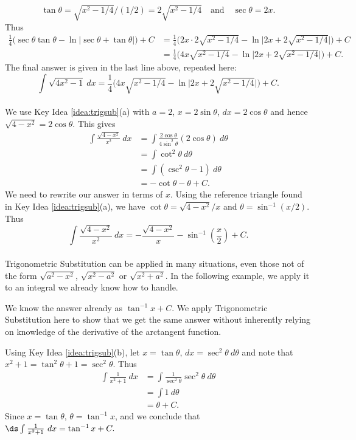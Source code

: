 {\[
\tan \theta = \sqrt{x^2-1/4}\Big/(1/2) = 2\sqrt{x^2-1/4}\quad \text{and}\quad \sec\theta = 2x.
\]
Thus\small 
\begin{align*}
\frac14\Big(\sec\theta\tan\theta -\ln\big|\sec\theta+\tan\theta\big|\Big)+C &=
				\frac14\Big(2x\cdot 2\sqrt{x^2-1/4} - \ln\big|2x + 2\sqrt{x^2-1/4}\big|\Big)+C\\
				&= \frac14\Big(4x\sqrt{x^2-1/4} - \ln\big|2x + 2\sqrt{x^2-1/4}\big|\Big)+C.
\end{align*}
\normalsize 
The final answer is given in the last line above, repeated here:
\[
\int \sqrt{4x^2-1}\ dx = \frac14\Big(4x\sqrt{x^2-1/4} - \ln\big|2x + 2\sqrt{x^2-1/4}\big|\Big)+C.
\]
}\\

{We use Key Idea \ref{idea:trigsub}(a) with $a=2$, $x=2\sin \theta$, $dx = 2\cos \theta$ and hence $\sqrt{4-x^2} = 2\cos\theta$. This gives
\begin{align*}
\int \frac{\sqrt{4-x^2}}{x^2}\ dx &= \int \frac{2\cos\theta}{4\sin^2\theta}(2\cos\theta)\ d\theta\\
		&= \int \cot^2\theta\ d\theta\\
		&=	\int (\csc^2\theta -1)\ d\theta\\
		&= -\cot\theta -\theta + C.
\end{align*}
We need to rewrite our answer in terms of $x$. Using the reference triangle found in Key Idea \ref{idea:trigsub}(a), we have $\cot\theta = \sqrt{4-x^2}/x$ and $\theta = \sin^{-1}(x/2)$. Thus
\[
\int \frac{\sqrt{4-x^2}}{x^2}\ dx = -\frac{\sqrt{4-x^2}}x-\sin^{-1}\left(\frac x2\right) + C.
\]
}\\

Trigonometric Substitution can be applied in many situations, even those not of the form $\sqrt{a^2-x^2}$, $\sqrt{x^2-a^2}$ or $\sqrt{x^2+a^2}$. In the following example, we apply it to an integral we already know how to handle.\\

{We know the answer already as $\tan^{-1}x+C$. We apply Trigonometric Substitution here to show that we get the same answer without inherently relying on knowledge of the derivative of the arctangent function.

Using Key Idea \ref{idea:trigsub}(b), let $x=\tan\theta$, $dx=\sec^2\theta\ d\theta$ and note that $x^2+1 = \tan^2\theta+1 = \sec^2\theta$. Thus
\begin{align*}
\int \frac1{x^2+1}\ dx &= \int \frac{1}{\sec^2\theta}\sec^2\theta\ d\theta \\
			&= \int 1\ d\theta\\
			&= \theta + C.
\end{align*}
Since $x=\tan \theta$, $\theta = \tan^{-1}x$, and we conclude that $\ds \int\frac1{x^2+1}\ dx = \tan^{-1}x+C.$
}\\


